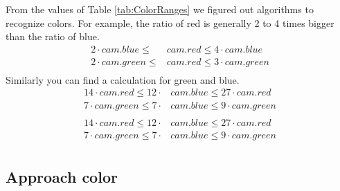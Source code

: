 \documentclass[a4paper]{article}
\begin{document}
			\noindent From the values of Table \ref{tab:ColorRanges} we figured out algorithms 
			to recognize colors. For example, the ratio of red is generally 2 to 4 times bigger 
			than the ratio of blue.	
			\begin{align*}
				2 \cdot cam.blue \leq &cam.red \leq 4 \cdot cam.blue \\
				2 \cdot cam.green \leq &cam.red \leq 3 \cdot cam.green\\
			\end{align*}
			Similarly you can find a calculation for green and blue.
			\begin{align*}
				14 \cdot cam.red \leq 12 \cdot &cam.blue \leq 27 \cdot cam.red \\
				7 \cdot cam.green \leq 7 \cdot &cam.blue \leq 9 \cdot cam.green\\
				\\
				14 \cdot cam.red \leq 12 \cdot &cam.blue \leq 27 \cdot cam.red \\
				7 \cdot cam.green \leq 7 \cdot &cam.blue \leq 9 \cdot cam.green\\
			\end{align*}	
			
		\newpage							
		\subsection{Approach color}
	
\end{document}
